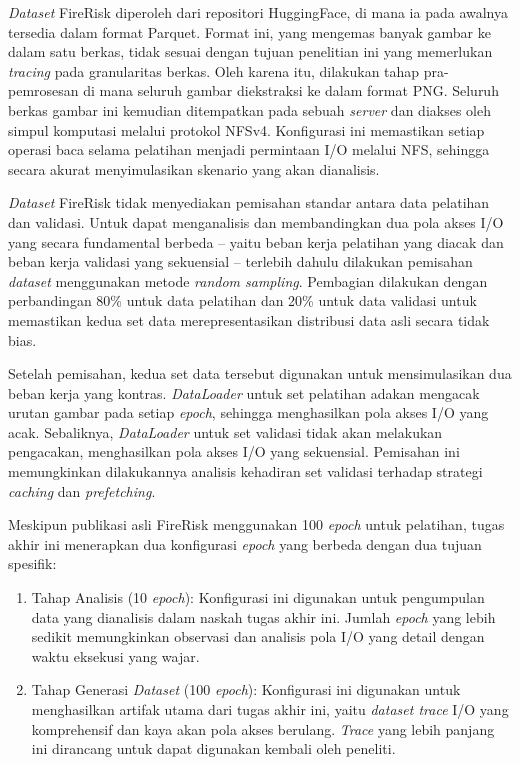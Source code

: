 \textit{Dataset} FireRisk diperoleh dari repositori HuggingFace, di mana ia pada awalnya tersedia dalam format Parquet. Format ini, yang mengemas banyak gambar ke dalam satu berkas, tidak sesuai dengan tujuan penelitian ini yang memerlukan \textit{tracing} pada granularitas berkas. Oleh karena itu, dilakukan tahap pra-pemrosesan di mana seluruh gambar diekstraksi ke dalam format PNG. Seluruh berkas gambar ini kemudian ditempatkan pada sebuah \textit{server} dan diakses oleh simpul komputasi melalui protokol NFSv4. Konfigurasi ini memastikan setiap operasi baca selama pelatihan menjadi permintaan I/O melalui NFS, sehingga secara akurat menyimulasikan skenario yang akan dianalisis.

\textit{Dataset} FireRisk tidak menyediakan pemisahan standar antara data pelatihan dan validasi. Untuk dapat menganalisis dan membandingkan dua pola akses I/O yang secara fundamental berbeda -- yaitu beban kerja pelatihan yang diacak dan beban kerja validasi yang sekuensial -- terlebih dahulu dilakukan pemisahan \textit{dataset} menggunakan metode \textit{random sampling}. Pembagian dilakukan dengan perbandingan 80\% untuk data pelatihan dan 20\% untuk data validasi untuk memastikan kedua set data merepresentasikan distribusi data asli secara tidak bias.

Setelah pemisahan, kedua set data tersebut digunakan untuk mensimulasikan dua beban kerja yang kontras. \textit{DataLoader} untuk set pelatihan adakan mengacak urutan gambar pada setiap \textit{epoch}, sehingga menghasilkan pola akses I/O yang acak. Sebaliknya, \textit{DataLoader} untuk set validasi tidak akan melakukan pengacakan, menghasilkan pola akses I/O yang sekuensial. Pemisahan ini memungkinkan dilakukannya analisis kehadiran set validasi terhadap strategi \textit{caching} dan \textit{prefetching}.

Meskipun publikasi asli FireRisk menggunakan 100 \textit{epoch} untuk pelatihan, tugas akhir ini menerapkan dua konfigurasi \textit{epoch} yang berbeda dengan dua tujuan spesifik:
\begin{enumerate}
    \item Tahap Analisis (10 \textit{epoch}): Konfigurasi ini digunakan untuk pengumpulan data yang dianalisis dalam naskah tugas akhir ini. Jumlah \textit{epoch} yang lebih sedikit memungkinkan observasi dan analisis pola I/O yang detail dengan waktu eksekusi yang wajar.
    \item Tahap Generasi \textit{Dataset} (100 \textit{epoch}): Konfigurasi ini digunakan untuk menghasilkan artifak utama dari tugas akhir ini, yaitu \textit{dataset trace} I/O yang komprehensif dan kaya akan pola akses berulang. \textit{Trace} yang lebih panjang ini dirancang untuk dapat digunakan kembali oleh peneliti.
\end{enumerate}

